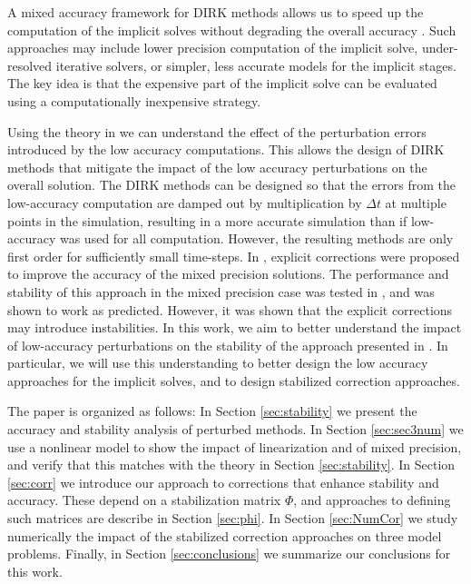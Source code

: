\documentclass{siamart251104}
\newcommand{\dt}{\Delta t}
\begin{document}
A mixed accuracy framework for DIRK methods
allows us to speed up the computation of the implicit solves without degrading the overall accuracy \cite{Grant2022}. Such approaches may include lower precision computation of the implicit solve, under-resolved iterative solvers,
or simpler, less accurate models for the implicit stages. 
The key idea is that the expensive part of 
the implicit solve  can be evaluated using a 
computationally inexpensive strategy.  

Using the theory in \cite{Grant2022} we can understand 
the effect of the perturbation errors introduced by the 
low accuracy computations. This allows the 
design of DIRK methods that mitigate the impact of 
the low accuracy perturbations on the overall solution. 
The DIRK methods can be designed so that the errors from the  
low-accuracy computation  are damped out by multiplication 
by $\dt$ at  multiple points in the simulation, 
resulting in a more accurate simulation than if 
low-accuracy was used for all computation.
However, the resulting methods are only first order for sufficiently small time-steps.
In \cite{Grant2022}, explicit corrections were proposed to improve the 
accuracy of the mixed precision solutions. The performance and stability 
of this  approach in the mixed precision case was 
tested in \cite{Burnett1, Burnett2}, and was shown to 
work as predicted.  However, it was shown that the explicit
corrections may introduce instabilities.
In this work, we aim to better understand the impact
of low-accuracy perturbations on the stability of the
approach presented in \cite{Grant2022}.
In particular, we will use this understanding 
to better design the low accuracy approaches for 
the implicit solves, and to  design  stabilized
correction approaches.

The paper is organized as follows: In Section \ref{sec:stability}
we present the accuracy and stability analysis of perturbed methods.
In Section \ref{sec:sec3num} we use a nonlinear model to show the impact
of linearization and of mixed precision, and verify that this matches
with the theory in Section \ref{sec:stability}.
In Section \ref{sec:corr} we introduce our approach to corrections that
enhance stability and accuracy. These depend on a stabilization matrix $\Phi$, and approaches
to defining such matrices are describe in Section \ref{sec:phi}.
In Section \ref{sec:NumCor} we study numerically the impact of the stabilized
correction approaches on three model problems. Finally, in Section \ref{sec:conclusions}
we summarize our conclusions for this work.
\end{document}
